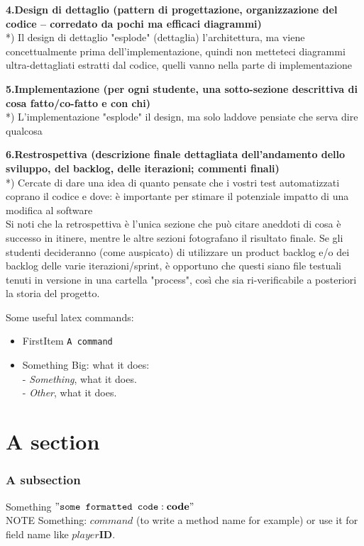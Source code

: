 \documentclass[10pt,english]{article}
\begin{document}
\textbf{4.Design di dettaglio (pattern di progettazione, organizzazione del codice -- corredato da pochi ma efficaci diagrammi)} \\

*) Il design di dettaglio "esplode" (dettaglia) l'architettura, ma viene concettualmente prima dell'implementazione, quindi non metteteci diagrammi ultra-dettagliati estratti dal codice, quelli vanno nella parte di implementazione

\textbf{5.Implementazione (per ogni studente, una sotto-sezione descrittiva di cosa fatto/co-fatto e con chi)} \\

*) L'implementazione "esplode" il design, ma solo laddove pensiate che serva dire qualcosa

\textbf{6.Restrospettiva (descrizione finale dettagliata dell'andamento dello sviluppo, del backlog, delle iterazioni; commenti finali)} \\

*) Cercate di dare una idea di quanto pensate che i vostri test automatizzati coprano il codice e dove: è importante per stimare il potenziale impatto di una modifica al software\\


Si noti che la retrospettiva è l'unica sezione che può citare aneddoti di cosa è successo in itinere, mentre le altre sezioni fotografano il risultato finale. Se gli studenti decideranno (come auspicato) di utilizzare un product backlog e/o dei backlog delle varie iterazioni/sprint, è opportuno che questi siano file testuali tenuti in versione in una cartella "process", così che sia ri-verificabile a posteriori la storia del progetto.\\


















\newpage

Some useful latex commands:\\

\begin{itemize}
\item FirstItem  \texttt{A command}\\


\item Something Big: what it does: \\
- \textit{Something}, what it does.\\
- \textit{Other}, what it does.

\end{itemize}

\section*{A section}

\subsubsection*{A subsection}
Something $"\texttt{some formatted code}:\textbf{code}"$\\

NOTE Something: $command$ (to write a method name for example) or use it for field name like $player\textbf{ID}$. 
\end{document}
